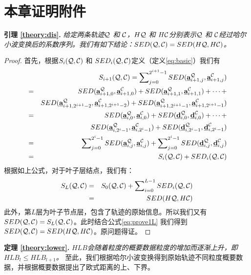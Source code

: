 \section*{本章证明附件}\label{sec-c4-Appendix}
\textbf{引理 \ref{theory:dis}. }{\em 给定两条轨迹${\cal Q}$ 和 ${\cal C}$，$H{\cal Q}$ 和 $H{\cal C}$分别表示${\cal Q}$ 和 ${\cal C}$经过哈尔小波变换后的系数序列。我们有如下结论：$SED({\cal Q},{\cal C})=SED(H{\cal Q},H{\cal C})$。}
\begin{proof}
	首先，根据$S_{i}({\cal Q}, {\cal C})$ 和 $SED_{i}({\cal Q}, {\cal C})$定义（定义\ref{eq:basic}）我们有
	\allowdisplaybreaks
	\begin{eqnarray}
	&&	S_{i+1}({\cal Q}, {\cal C})=\sum\nolimits_{j=0}^{2^{i+1}-1}SED(\emph{{\textbf{a}}}_{i+1,j}^{\cal Q},\emph{{\textbf{a}}}_{i+1,j}^{\cal C}) \nonumber \\
	&=&SED(\emph{{\textbf{a}}}_{i+1,0}^{\cal Q},\emph{{\textbf{a}}}_{i+1,0}^{\cal C}) + SED(\emph{{\textbf{a}}}_{i+1,1}^{\cal Q},\emph{{\textbf{a}}}_{i+1,1}^{\cal C}) + \cdots + \nonumber \\
	&\,& SED(\emph{{\textbf{a}}}_{i+1,2^{i+1}-2}^{\cal Q},\emph{{\textbf{a}}}_{i+1,2^{i+1}-2}^{\cal C}) + 	SED(\emph{{\textbf{a}}}_{i+1,2^{i+1}-1}^{\cal Q},\emph{{\textbf{a}}}_{i+1,2^{i+1}-1}^{\cal C}) \nonumber \\
	&=&SED(\emph{{\textbf{a}}}_{i,0}^{\cal Q},\emph{{\textbf{a}}}_{i,0}^{\cal C})  +   SED(\emph{{\textbf{d}}}_{i,0}^{\cal Q}, \emph{{\textbf{d}}}_{i,0}^{\cal C})   + \cdots+\nonumber \\
	&\,& SED(\emph{{\textbf{a}}}_{i,2^{i}-1}^{\cal Q},\emph{{\textbf{a}}}_{i,2^{i}-1}^{\cal C})  +   SED(\emph{{\textbf{d}}}_{i,2^{i}-1}^{\cal Q}, \emph{{\textbf{d}}}_{i,2^{i}-1}^{\cal C})  \nonumber   \nonumber \\
	&=& \sum\nolimits_{j=0}^{2^i-1}SED(\emph{{\textbf{a}}}_{i,j}^{\cal Q}, \emph{{\textbf{a}}}_{i,j}^{\cal C})+ \sum\nolimits_{j=0}^{2^i-1}SED(\emph{{\textbf{d}}}_{i,j}^{\cal Q}, \emph{{\textbf{d}}}_{i,j}^{\cal C})\nonumber \\
	&=&S_{i}({\cal Q}, {\cal C})+SED_{i}({\cal Q},{\cal C})
	\end{eqnarray}
	\allowdisplaybreaks[4]
根据如上公式，对于叶子层结点，我们有：
	\begin{eqnarray} \label{eq:prove1L}
	S_{L}({\cal Q},{\cal C})&=&S_{0}({\cal Q},{\cal C})+ \sum\nolimits_{i=0}^{L-1}{SED_{i}({\cal Q},{\cal C})} \nonumber \\
	&=& SED(H{\cal Q},H{\cal C})
	\end{eqnarray}
	此外，第$L$层为叶子节点层，包含了轨迹的原始信息。所以我们又有$SED({\cal Q},{\cal C}) = S_{L}({\cal Q},{\cal C})$。此时结合公式\ref{eq:prove1L}
	我们得到 $SED({\cal Q},{\cal C})=SED(H{\cal Q},H{\cal C})$。原问题得证。
\end{proof}

\textbf{定理 \ref{theory:lower}. }{\em $HLB$会随着粒度的概要数据粒度的增加而逐渐上升，即$HLB_{l} \le HLB_{l+1}$。}
至此，我们根据哈尔小波变换得到原始轨迹不同粒度概要数据，并根据概要数据提出了欧式距离的上、下界。


